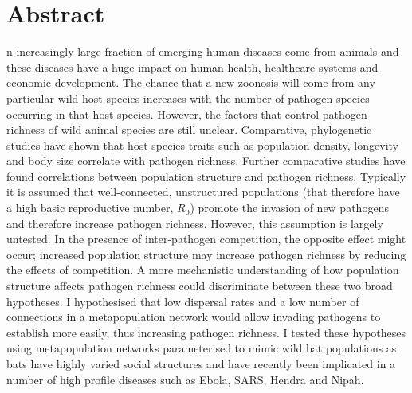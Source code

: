 







\section{Abstract}


n increasingly large fraction of emerging human diseases come from animals and these diseases have a huge impact on human health, healthcare systems and economic development.
The chance that a new zoonosis will come from any particular wild host species increases with the number of pathogen species occurring in that host species.
However, the factors that control pathogen richness of wild animal species are still unclear.
%
%
Comparative, phylogenetic studies have shown that host-species traits such as population density, longevity and body size correlate with pathogen richness.
Further comparative studies have found correlations between population structure and pathogen richness.
Typically it is assumed that well-connected, unstructured populations (that therefore have a high basic reproductive number, $R_0$) promote the invasion of new pathogens and therefore increase pathogen richness. %
However, this assumption is largely untested.
In the presence of inter-pathogen competition, the opposite effect might occur; increased population structure may increase pathogen richness by reducing the effects of competition.
A more mechanistic understanding of how population structure affects pathogen richness could discriminate between these two broad hypotheses.
%
I hypothesised that low dispersal rates and a low number of connections in a metapopulation network would allow invading pathogens to establish more easily, thus increasing pathogen richness. 
I tested these hypotheses using metapopulation networks parameterised to mimic wild bat populations as bats have highly varied social structures and have recently been implicated in a number of high profile diseases such as Ebola, SARS, Hendra and Nipah.
